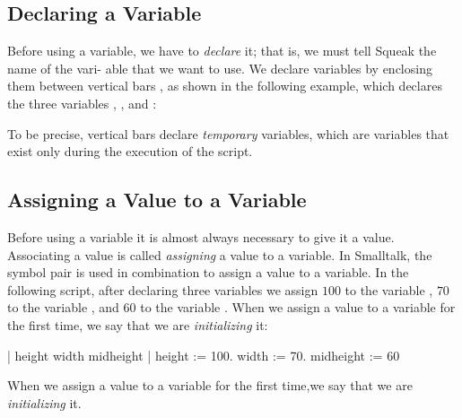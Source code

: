 \documentclass[a4paper,10pt,twoside]{book}
\begin{document}

\subsection{Declaring a Variable} 

Before using a variable, we have to \emph{declare} it; that is, we must tell Squeak the name of the vari- 
able that we want to use. We declare variables by enclosing them between vertical bars \ct{||}, 
as shown in the following example, which declares the three variables , , and 
: 


To be precise, vertical bars \ct{||} declare \emph{temporary} variables, which are variables that exist only 
during the execution of the script. 


\subsection{Assigning a Value to a Variable} 

Before using a variable it is almost always necessary to give it a value. Associating a value is 
called \emph{assigning} a value to a variable. In Smalltalk, the symbol pair \ct{:=} is used in combination 
to assign a value to a variable. In the following script, after declaring three variables we assign 
$100$ to the variable , $70$ to the variable , and $60$ to the variable . When we assign a value to a variable for the first time, we say that we are \emph{initializing} it: 

\begin{code}{}
| height width midheight | 
height := 100. 
width := 70. 
midheight := 60 
\end{code}


When we assign a value to a variable for the first time,we say that we are \emph{initializing} it. 
\end{document}

